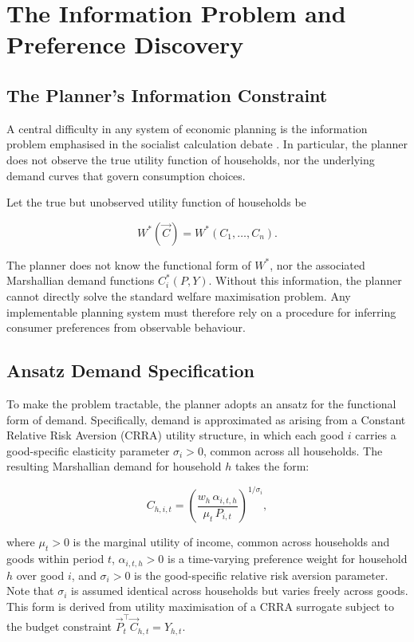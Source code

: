 \section{The Information Problem and Preference Discovery} \label{sec:information}

\subsection{The Planner's Information Constraint}

A central difficulty in any system of economic planning is the
information problem emphasised in the socialist calculation debate
\citet{vonmises1920, hayek1945use}. In particular, the planner does
not observe the true utility function of households, nor the
underlying demand curves that govern consumption choices.

Let the true but unobserved utility function of households be

\[
W^*(\vec{C}) = W^*(C_1, \dots, C_n).
\]

The planner does not know the functional form of $W^*$, nor the
associated Marshallian demand functions $C_i^*(P, Y)$. Without this
information, the planner cannot directly solve the standard welfare
maximisation problem. Any implementable planning system must therefore
rely on a procedure for inferring consumer preferences from observable
behaviour.

\subsection{Ansatz Demand Specification}

To make the problem tractable, the planner adopts an ansatz for the
functional form of demand. Specifically, demand is approximated as
arising from a Constant Relative Risk Aversion (CRRA) utility
structure, in which each good $i$ carries a good-specific elasticity
parameter $\sigma_i > 0$, common across all households. The
resulting Marshallian demand for household $h$ takes the form:

\[
C_{h,i,t} = \left(\frac{w_h\,\alpha_{i,t,h}}{\mu_t\, P_{i,t}}\right)^{1/\sigma_i},
\]

where $\mu_t > 0$ is the marginal utility of income, common across
households and goods within period $t$, $\alpha_{i,t,h} > 0$ is a
time-varying preference weight for household $h$ over good $i$, and
$\sigma_i > 0$ is the good-specific relative risk aversion parameter.
Note that $\sigma_i$ is assumed identical across households but varies
freely across goods. This form is derived from utility maximisation of
a CRRA surrogate subject to the budget constraint
$\vec{P}_t^\top\vec{C}_{h,t} = Y_{h,t}$.

